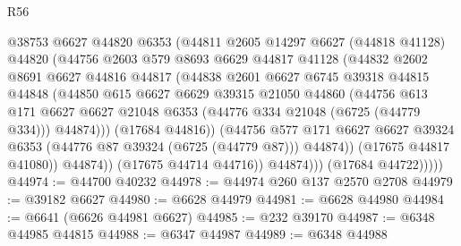 \begin{lexlean}{R56}
\begin{coremodule}
                        @38753
                        @6627
                        @44820
                        @6353
                        (@44811
                          @2605
                          @14297
                          @6627
                          (@44818 @41128)
                          @44820
                          (@44756
                            @2603
                            @579
                            @8693
                            @6629
                            @44817
                            @41128
                            (@44832
                              @2602
                              @8691
                              @6627
                              @44816
                              @44817
                              (@44838
                                @2601
                                @6627
                                @6745
                                @39318
                                @44815
                                @44848
                                (@44850
                                  @615
                                  @6627
                                  @6629
                                  @39315
                                  @21050
                                  @44860
                                  (@44756
                                    @613
                                    @171
                                    @6627
                                    @6627
                                    @21048
                                    @6353
                                    (@44776 @334 @21048 (@6725 (@44779 @334)))
                                    @44874)))
                              (@17684 @44816))
                            (@44756
                              @577
                              @171
                              @6627
                              @6627
                              @39324
                              @6353
                              (@44776 @87 @39324 (@6725 (@44779 @87)))
                              @44874))
                          (@17675 @44817 @41080))
                        @44874))
                    (@17675 @44714 @44716))
                  @44874)))
            (@17684 @44722)))))
@44974 := @44700 @40232
@44978 := @44974 @260 @137 @2570 @2708
@44979 := @39182 @6627
@44980 := @6628 @44979
@44981 := @6628 @44980
@44984 := @6641 (@6626 @44981 @6627)
@44985 := @232 @39170
@44987 := @6348 @44985 @44815
@44988 := @6347 @44987
@44989 := @6348 @44988

\end{coremodule}
\end{lexlean}
